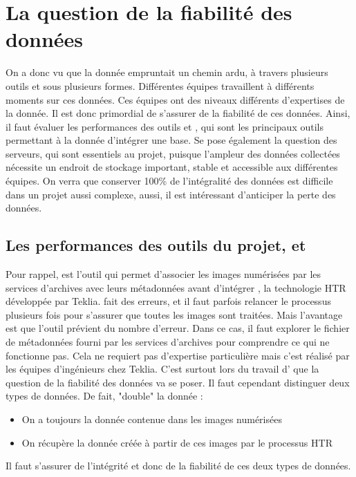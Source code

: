 \chapter{La question de la fiabilité des données}

On a donc vu que la donnée empruntait un chemin ardu, à travers plusieurs outils et sous plusieurs formes. Différentes équipes travaillent à différents moments sur ces données. Ces équipes ont des niveaux différents d’expertises de la donnée. Il est donc primordial de s’assurer de la fiabilité de ces données. Ainsi, il faut évaluer les performances des outils \Spider{} et \Arkindex{}, qui sont les principaux outils permettant à la donnée d’intégrer une base. Se pose également la question des serveurs, qui sont essentiels au projet, puisque l’ampleur des données collectées nécessite un endroit de stockage important, stable et accessible aux différentes équipes. On verra que conserver 100\% de l’intégralité des données est difficile dans un projet aussi complexe, aussi, il est intéressant d’anticiper la perte des données. 

    \section{Les performances des outils du projet, \Spider{} et \Arkindex{}}

Pour rappel, \Spider{} est l’outil qui permet d’associer les images numérisées par les services d’archives avec leurs métadonnées avant d’intégrer \Arkindex{}, la technologie HTR développée par Teklia. \Spider{} fait des erreurs, et il faut parfois relancer le processus plusieurs fois pour s’assurer que toutes les images sont traitées. Mais l’avantage est que l’outil prévient du nombre d’erreur. Dans ce cas, il faut explorer le fichier de métadonnées fourni par les services d’archives pour comprendre ce qui ne fonctionne pas. Cela ne requiert pas d’expertise particulière mais c’est réalisé par les équipes d’ingénieurs chez Teklia. 
C’est surtout lors du travail d’\Arkindex{} que la question de la fiabilité des données va se poser. Il faut cependant distinguer deux types de données. De fait, \Arkindex{} "double" la donnée : 

\begin{samepage}
\begin{itemize}
    \item On a toujours la donnée contenue dans les images numérisées
    \item On récupère la donnée créée à partir de ces images par le processus HTR
\end{itemize}
\end{samepage}
Il faut s’assurer de l’intégrité et donc de la fiabilité de ces deux types de données.\\

